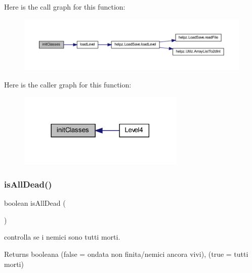 Here is the call graph for this function\+:\nopagebreak
\begin{figure}[H]
\begin{center}
\leavevmode
\includegraphics[width=350pt]{classscenes_1_1_level4_afe125d345675ffefe8da7e96d39773f3_cgraph}
\end{center}
\end{figure}
Here is the caller graph for this function\+:\nopagebreak
\begin{figure}[H]
\begin{center}
\leavevmode
\includegraphics[width=225pt]{classscenes_1_1_level4_afe125d345675ffefe8da7e96d39773f3_icgraph}
\end{center}
\end{figure}
\mbox{\label{classscenes_1_1_level4_acd1846d50c3d8678777f9ab6716f5cf3}} 
\subsubsection{\texorpdfstring{is\+All\+Dead()}{isAllDead()}}
{\footnotesize\ttfamily boolean is\+All\+Dead (\begin{DoxyParamCaption}{ }\end{DoxyParamCaption})\hspace{0.3cm}{\ttfamily [private]}}



controlla se i nemici sono tutti morti. 

\begin{DoxyReturn}{Returns}
booleana (false = ondata non finita/nemici ancora vivi), (true = tutti morti) 
\end{DoxyReturn}



